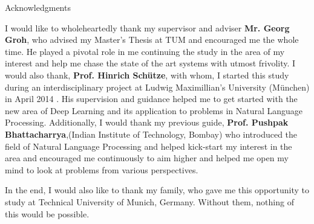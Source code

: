 \thispagestyle{empty}

\vspace*{2cm}

\begin{center}
{ Acknowledgments}
\end{center}

\vspace{1cm}

I would like to wholeheartedly thank my supervisor and adviser \textbf{Mr. Georg Groh}, who advised my Master's Thesis at TUM and encouraged me the whole time. He played a pivotal role in me continuing the study in the area of my interest and help me chase the state of the art systems with utmost frivolity. I would also thank, \textbf{Prof. Hinrich Schütze}, with whom, I started this study during an interdisciplinary project at Ludwig Maximillian's University (München) in April 2014 . His supervision and guidance helped me to get started with the new area of Deep Learning and its application to problems in Natural Language Processing. Additionally, I would thank my previous guide, \textbf{Prof. Pushpak Bhattacharrya},(Indian Institute of Technology, Bombay) who introduced the field of Natural Language Processing and helped kick-start my interest in the area and encouraged me continuously to aim higher and helped me open my mind to look at problems from various perspectives.  

In the end, I would also like to thank my family, who gave me this opportunity to study at Technical University of Munich, Germany. Without them, nothing of this would be possible. 
\cleardoublepage{}
